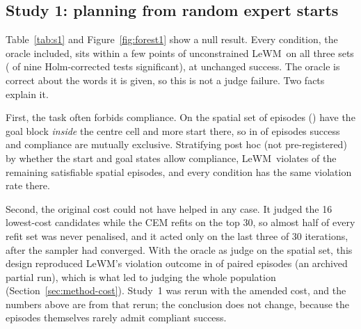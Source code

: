 \documentclass[11pt]{article}
\newcommand{\lewm}{LeWM}
\newcommand{\gentable}[1]{{\small\begin{adjustbox}{max width=\linewidth}\end{adjustbox}}}
\begin{document}
\subsection{Study 1: planning from random expert starts}\label{sec:s1}
\begin{table}[t]\centering\caption{Study 1 (random expert starts; $\lambda=1$, $\tau=0.5$;  seeds $\times$  episodes per cell). Episode violation and success rates with 95\% bootstrap intervals. A $\star$ would mark a paired Wilcoxon test against \lewm\ significant after Holm correction across sets; no cell qualifies.}\label{tab:s1}
\gentable{figures/table_planning_s1.tex}
\end{table}

Table~\ref{tab:s1} and Figure~\ref{fig:forest1} show a null result. Every condition, the oracle included, sits within a few points of unconstrained \lewm\ on all three sets ( of nine Holm-corrected tests significant), at unchanged success. The oracle is correct about the words it is given, so this is not a judge failure. Two facts explain it.

First, the task often forbids compliance. On the spatial set  of  episodes () have the goal block \emph{inside} the centre cell and  more start there, so in  of episodes success and compliance are mutually exclusive. Stratifying post hoc (not pre-registered) by whether the start and goal states allow compliance, \lewm\ violates  of the remaining  satisfiable spatial episodes, and every condition has the same violation rate there.

Second, the original cost could not have helped in any case. It judged the 16 lowest-cost candidates while the CEM refits on the top 30, so almost half of every refit set was never penalised, and it acted only on the last three of 30 iterations, after the sampler had converged. With the oracle as judge on the spatial set, this design reproduced \lewm's violation outcome in  of  paired episodes (an archived partial run), which is what led to judging the whole population (Section~\ref{sec:method-cost}). Study~1 was rerun with the amended cost, and the numbers above are from that rerun; the conclusion does not change, because the episodes themselves rarely admit compliant success.
\end{document}
